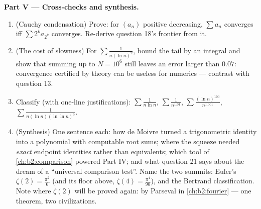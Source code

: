 \begin{problem}[{Weekend problem --- $\zeta(2) = \pi^2/6$ and the
Bertrand panorama}]
\medskip
\noindent\textbf{Part V --- Cross-checks and synthesis.}
\begin{enumerate}[resume]
  \item (Cauchy condensation) Prove: for $(a_n)$ positive
        decreasing, $\sum a_n$ converges iff $\sum 2^k a_{2^k}$
        converges. Re-derive question 18's frontier from it.
  \item (The cost of slowness) For $\sum\frac1{n(\ln n)^2}$,
        bound the tail by an integral and show that summing up
        to $N = 10^6$ still leaves an error larger than
        $0.07$: convergence certified by theory can be useless
        for numerics --- contrast with question 13.
  \item Classify (with one-line justifications):
        $\sum\frac1{n\ln n}$, $\sum\frac1{n^{1.01}}$,
        $\sum\frac{(\ln n)^{100}}{n^{1.001}}$,
        $\sum\frac1{n(\ln n)(\ln\ln n)^{3}}$.
  \item (Synthesis) One sentence each: how de Moivre turned a
        trigonometric identity into a polynomial with computable
        root sums; where the squeeze needed \emph{exact}
        endpoint identities rather than equivalents; which tool
        of \cref{ch:b2:comparison} powered Part IV; and what
        question 21 says about the dream of a ``universal
        comparison test''. Name the two summits: Euler's
        $\zeta(2) = \frac{\pi^2}6$ (and its floor above,
        $\zeta(4) = \frac{\pi^4}{90}$), and the Bertrand
        classification. Note where $\zeta(2)$ will be proved
        again: by Parseval in \cref{ch:b2:fourier} --- one
        theorem, two civilizations.
\end{enumerate}
\end{problem}
